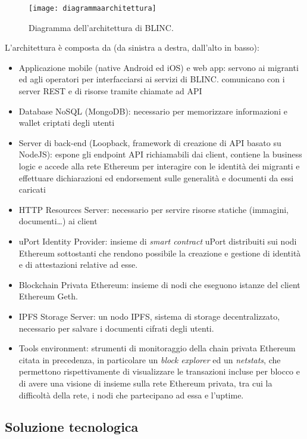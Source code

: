\begin{figure}[!ht]
    \texttt{[image: diagrammaarchitettura]}
    \caption{Diagramma dell'architettura di BLINC.}
    \label{fig:diagrammaarchitettura}
\end{figure}

L’architettura è composta da (da sinistra a destra, dall’alto in basso):
\begin{itemize}
    \item Applicazione mobile (native Android ed iOS) e web app: servono ai migranti ed agli operatori per interfacciarsi ai servizi di BLINC.
    comunicano con i server REST e di risorse tramite chiamate ad API
    \item Database NoSQL (MongoDB): necessario per memorizzare informazioni e wallet criptati degli utenti
    \item Server di back-end (Loopback, framework di creazione di API basato su NodeJS): espone gli endpoint API richiamabili
    dai client, contiene la business logic e accede alla rete Ethereum per interagire
    con le identità dei migranti e effettuare dichiarazioni ed endorsement sulle generalità e documenti da essi caricati
    \item HTTP Resources Server: necessario per servire risorse statiche (immagini, documenti…) ai client
    \item uPort Identity Provider: insieme di \emph{smart contract} uPort distribuiti sui nodi Ethereum sottostanti che rendono
    possibile la creazione e gestione di identità e di attestazioni relative ad esse.
    \item Blockchain Privata Ethereum: insieme di nodi che eseguono istanze del client Ethereum Geth.
    \item IPFS Storage Server: un nodo IPFS, sistema di storage decentralizzato, necessario per salvare i documenti cifrati degli utenti.
    \item Tools environment: strumenti di monitoraggio della chain privata Ethereum citata in precedenza, in particolare un \emph{block explorer} ed un
    \emph{netstats}, che permettono rispettivamente di visualizzare le transazioni incluse per blocco e di avere una visione di insieme sulla rete Ethereum privata,
    tra cui la difficoltà della rete, i nodi che partecipano ad essa e l'uptime.
\end{itemize}

\subsection{Soluzione tecnologica}


